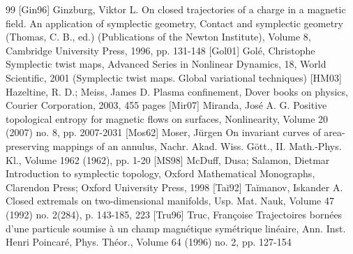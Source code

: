\begin{thebibliography}{99}
 [Gin96] Ginzburg, Viktor L. On closed trajectories of a charge in a magnetic field. An application of symplectic geometry, Contact and symplectic geometry (Thomas, C. B., ed.) (Publications of the Newton Institute), Volume 8, Cambridge University Press, 1996, pp. 131-148
 [Gol01] Golé, Christophe Symplectic twist maps, Advanced Series in Nonlinear Dynamics, 18, World Scientific, 2001 (Symplectic twist maps. Global variational techniques)
 [HM03] Hazeltine, R. D.; Meiss, James D. Plasma confinement, Dover books on physics, Courier Corporation, 2003, 455 pages
 [Mir07] Miranda, José A. G. Positive topological entropy for magnetic flows on surfaces, Nonlinearity, Volume 20 (2007) no. 8, pp. 2007-2031
 [Mos62] Moser, Jürgen On invariant curves of area-preserving mappings of an annulus, Nachr. Akad. Wiss. Gött., II. Math.-Phys. Kl., Volume 1962 (1962), pp. 1-20
 [MS98] McDuff, Dusa; Salamon, Dietmar Introduction to symplectic topology, Oxford Mathematical Monographs, Clarendon Press; Oxford University Press, 1998
 [Taĭ92] Taĭmanov, Iskander A. Closed extremals on two-dimensional manifolds, Usp. Mat. Nauk, Volume 47 (1992) no. 2(284), p. 143-185, 223
 [Tru96] Truc, Françoise Trajectoires bornées d’une particule soumise à un champ magnétique symétrique linéaire, Ann. Inst. Henri Poincaré, Phys. Théor., Volume 64 (1996) no. 2, pp. 127-154
\end{thebibliography}
